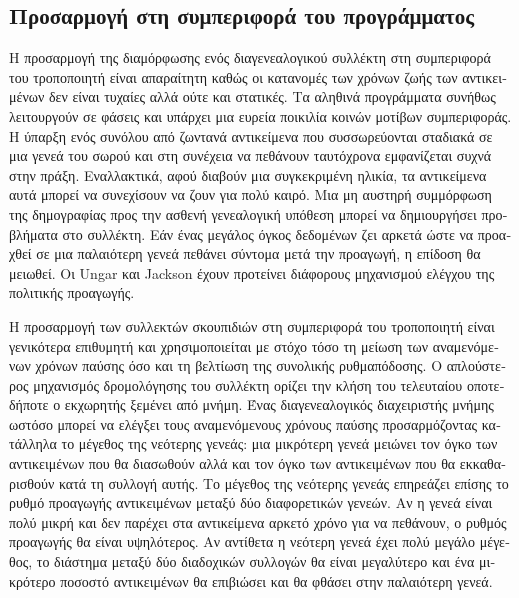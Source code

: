 \begin{greek}
\section{Προσαρμογή στη συμπεριφορά του προγράμματος}
Η προσαρμογή της διαμόρφωσης ενός διαγενεαλογικού συλλέκτη στη
συμπεριφορά του τροποποιητή είναι απαραίτητη καθώς οι κατανομές
των χρόνων ζωής των αντικειμένων δεν είναι τυχαίες αλλά ούτε
και στατικές. Τα αληθινά προγράμματα συνήθως λειτουργούν σε φάσεις
και υπάρχει μια ευρεία ποικιλία κοινών μοτίβων συμπεριφοράς.
Η ύπαρξη ενός συνόλου από ζωντανά αντικείμενα που συσσωρεύονται
σταδιακά σε μια γενεά του σωρού και στη συνέχεια να πεθάνουν
ταυτόχρονα εμφανίζεται συχνά στην πράξη. Εναλλακτικά, αφού
διαβούν μια συγκεκριμένη ηλικία, τα αντικείμενα αυτά μπορεί
να συνεχίσουν να ζουν για πολύ καιρό. Μια μη αυστηρή συμμόρφωση
της δημογραφίας προς την ασθενή γενεαλογική υπόθεση μπορεί να
δημιουργήσει προβλήματα στο συλλέκτη. Εάν ένας μεγάλος όγκος
δεδομένων ζει αρκετά ώστε να προαχθεί σε μια παλαιότερη γενεά
πεθάνει σύντομα μετά την προαγωγή, η επίδοση θα μειωθεί.
Οι Ungar και Jackson \cite{DBLP:conf/oopsla/UngarJ88, DBLP:journals/toplas/UngarJ92}
έχουν προτείνει διάφορους μηχανισμού ελέγχου της πολιτικής
προαγωγής.

Η προσαρμογή των συλλεκτών σκουπιδιών στη συμπεριφορά του
τροποποιητή είναι γενικότερα επιθυμητή και χρησιμοποιείται
με στόχο τόσο τη μείωση των αναμενόμενων χρόνων παύσης όσο
και τη βελτίωση της συνολικής ρυθμαπόδοσης. Ο απλούστερος μηχανισμός
δρομολόγησης του συλλέκτη ορίζει την κλήση του τελευταίου
οποτεδήποτε ο εκχωρητής ξεμένει από μνήμη. Ένας διαγενεαλογικός
διαχειριστής μνήμης ωστόσο μπορεί να ελέγξει τους αναμενόμενους
χρόνους παύσης προσαρμόζοντας κατάλληλα το μέγεθος της νεότερης
γενεάς: μια μικρότερη γενεά μειώνει τον όγκο των αντικειμένων
που θα διασωθούν αλλά και τον όγκο των αντικειμένων που θα εκκαθαρισθούν
κατά τη συλλογή αυτής. Το μέγεθος της νεότερης γενεάς επηρεάζει
επίσης το ρυθμό προαγωγής αντικειμένων μεταξύ δύο διαφορετικών
γενεών. Αν η γενεά είναι πολύ μικρή και δεν παρέχει στα αντικείμενα
αρκετό χρόνο για να πεθάνουν, ο ρυθμός προαγωγής θα είναι υψηλότερος.
Αν αντίθετα η νεότερη γενεά έχει πολύ μεγάλο μέγεθος, το διάστημα
μεταξύ δύο διαδοχικών συλλογών θα είναι μεγαλύτερο και ένα
μικρότερο ποσοστό αντικειμένων θα επιβιώσει και θα φθάσει στην
παλαιότερη γενεά.


\end{greek}
